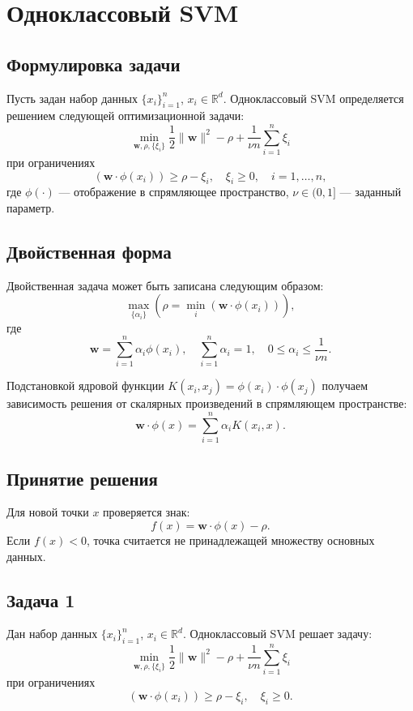 \section{Одноклассовый SVM}

\subsection{Формулировка задачи}
Пусть задан набор данных $\{x_i\}_{i=1}^n$, $x_i \in \mathbb{R}^d$. Одноклассовый SVM определяется решением следующей оптимизационной задачи:
\[
    \min_{\mathbf{w},\rho,\{\xi_i\}} \frac{1}{2}\|\mathbf{w}\|^2 - \rho + \frac{1}{\nu n}\sum_{i=1}^n \xi_i
\]
при ограничениях
\[
    (\mathbf{w}\cdot \phi(x_i)) \ge \rho - \xi_i, \quad \xi_i \ge 0, \quad i=1,\dots,n,
\]
где $\phi(\cdot)$ — отображение в спрямляющее пространство, $\nu \in (0,1]$ — заданный параметр.

\subsection{Двойственная форма}
Двойственная задача может быть записана следующим образом:
\[
    \max_{\{\alpha_i\}} \left( \rho = \min_i \left( \mathbf{w} \cdot \phi(x_i) \right) \right),
\]
где
\[
    \mathbf{w} = \sum_{i=1}^n \alpha_i \phi(x_i), \quad \sum_{i=1}^n \alpha_i = 1, \quad 0 \le \alpha_i \le \frac{1}{\nu n}.
\]

Подстановкой ядровой функции $K(x_i,x_j) = \phi(x_i) \cdot \phi(x_j)$ получаем зависимость решения от скалярных произведений в спрямляющем пространстве:
\[
    \mathbf{w} \cdot \phi(x) = \sum_{i=1}^n \alpha_i K(x_i,x).
\]

\subsection{Принятие решения}
Для новой точки $x$ проверяется знак:
\[
    f(x) = \mathbf{w}\cdot\phi(x) - \rho.
\]
Если $f(x)<0$, точка считается не принадлежащей множеству основных данных.

\subsection{Задача 1}
Дан набор данных $\{x_i\}_{i=1}^n$, $x_i \in \mathbb{R}^d$. Одноклассовый SVM решает задачу:
\[
    \min_{\mathbf{w},\rho,\{\xi_i\}} \frac{1}{2}\|\mathbf{w}\|^2 - \rho + \frac{1}{\nu n}\sum_{i=1}^n \xi_i
\]
при ограничениях
\[
    (\mathbf{w}\cdot\phi(x_i))\ge\rho-\xi_i, \quad \xi_i\ge0.
\]

